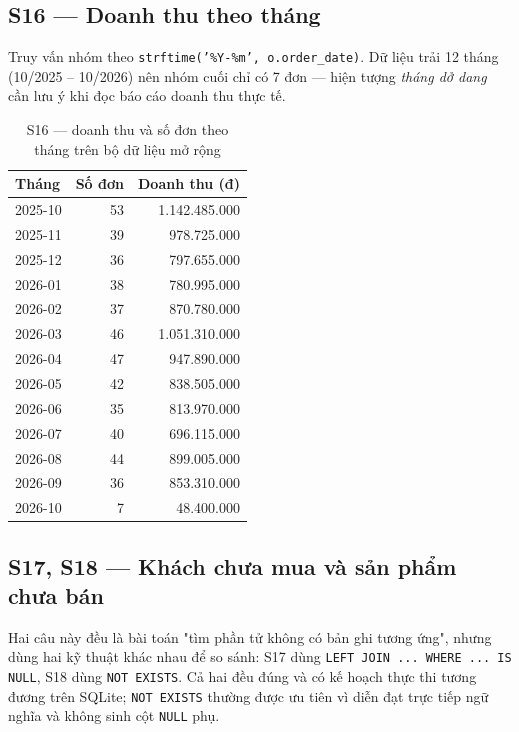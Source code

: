 \documentclass[12pt,a4paper]{article}
\newcommand{\code}[1]{\texttt{\small #1}}
\begin{document}
\subsection{S16 --- Doanh thu theo tháng}

Truy vấn nhóm theo \code{strftime('\%Y-\%m', o.order\_date)}. Dữ liệu trải 12 tháng (10/2025 --
10/2026) nên nhóm cuối chỉ có 7 đơn --- hiện tượng \emph{tháng dở dang} cần lưu ý khi đọc báo
cáo doanh thu thực tế.

\begin{table}[H]
\centering
\caption{S16 --- doanh thu và số đơn theo tháng trên bộ dữ liệu mở rộng}
\label{tab:s16}
\small
\begin{tabular}{@{}l r r@{}}
\toprule
\textbf{Tháng} & \textbf{Số đơn} & \textbf{Doanh thu (đ)} \\
\midrule
2025-10 & 53 & 1.142.485.000 \\
2025-11 & 39 &   978.725.000 \\
2025-12 & 36 &   797.655.000 \\
2026-01 & 38 &   780.995.000 \\
2026-02 & 37 &   870.780.000 \\
2026-03 & 46 & 1.051.310.000 \\
2026-04 & 47 &   947.890.000 \\
2026-05 & 42 &   838.505.000 \\
2026-06 & 35 &   813.970.000 \\
2026-07 & 40 &   696.115.000 \\
2026-08 & 44 &   899.005.000 \\
2026-09 & 36 &   853.310.000 \\
2026-10 &  7 &    48.400.000 \\
\bottomrule
\end{tabular}
\end{table}

\subsection{S17, S18 --- Khách chưa mua và sản phẩm chưa bán}

Hai câu này đều là bài toán "tìm phần tử không có bản ghi tương ứng", nhưng dùng hai kỹ thuật
khác nhau để so sánh: S17 dùng \code{LEFT JOIN ... WHERE ... IS NULL}, S18 dùng
\code{NOT EXISTS}. Cả hai đều đúng và có kế hoạch thực thi tương đương trên SQLite; \code{NOT EXISTS} thường được ưu tiên vì diễn đạt trực tiếp ngữ nghĩa và không sinh cột \code{NULL} phụ.
\end{document}
